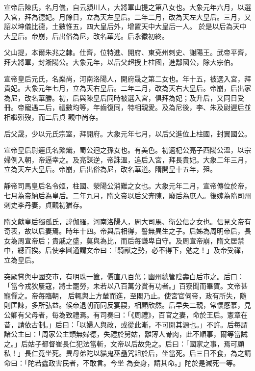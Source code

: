 \begin{pinyinscope}
 宣帝后陳氏，名月儀，自云潁川人，大將軍山提之第八女也。大象元年六月，以選入宮，拜為德妃。月餘日，立為天左皇后。二年二月，改為天左大皇后。三月，又詔以坤儀比德，土數惟五，四大皇后外，增置天中大皇后一人。
 於是以后為天中大皇后。帝崩，后出俗為尼，改名華光。后永徽初終。



 父山提，本爾朱兆之隸。仕齊，位特進、開府、東兗州刺史、謝陽王。武帝平齊，拜大將軍，封淅陽公。大象元年，以后父超授上柱國，進鄅國公，除大宗伯。



 宣帝皇后元氏，名樂尚，河南洛陽人，開府晟之第二女也。年十五，被選入宮，拜貴妃。大象元年七月，立為天右皇后。二年二月，改為天右大皇后。帝崩，后出家為尼，改名華勝。初，后與陳皇后同時被選入宮，俱拜為妃；及升后，又同日受冊。帝寵遇二后，禮數均等，年齒復同，特相親愛。及為尼後，李、朱及尉遲后並相繼殞歿，而二后貞
 觀中尚存。



 后父晟，少以元氏宗室，拜開府。大象元年七月，以后父進位上柱國，封翼國公。



 宣帝皇后尉遲氏名繁熾，蜀公迥之孫女也。有美色。初適杞公亮子西陽公溫，以宗婦例入朝，帝逼幸之。及亮謀逆，帝誅溫，追后入宮，拜長貴妃。大象二年三月，立為天左大皇后。帝崩，后出俗為尼，改名華道。隋開皇十五年，殂。



 靜帝司馬皇后名令姬，柱國、滎陽公消難之女也。大象元年二月，宣帝傳位於帝，七月為帝納后為皇后。二年九月，隋文帝以后父奔陳，廢后為庶人。後嫁為隋司州
 刺史李丹妻，貞觀初猶存。



 隋文獻皇后獨孤氏，諱伽羅，河南洛陽人，周大司馬、衛公信之女也。信見文帝有奇表，故以后妻焉。時年十四。帝與后相得，誓無異生之子。后姊為周明帝后，長女為周宣帝后；貴戚之盛，莫與為比，而后每謙卑自守。及周宣帝崩，隋文居禁中，總百揆。后使李圓通謂文帝曰：「騎獸之勢，必不得下，勉之！」及帝受禪，立為皇后。



 突厥嘗與中國交市，有明珠一篋，價直八百萬；幽州總管陰壽白后市之。后曰：「當今戎狄屢寇，將士罷勞，未若以八百萬分賞有功者。」百寮聞而畢賀。文帝甚寵憚之。帝每臨朝，
 后輒與上方輦而進，至閣乃止。使宮官伺帝，政有所失，隨則匡諫，多所弘益。候帝退朝而同反宴寢，相顧欣然。后早失二親，常懷感慕，見公卿有父母者，每為致禮焉。有司奏曰：「《周禮》，百官之妻，命於王后。憲章在昔，請依古制。」后曰：「以婦人與政，或從此漸，不可開其源也。」不許。后每謂諸公主曰：「周家公主類無婦德，失禮於舅姑，離薄人骨肉，此不順事，爾等當誡之。」后姑子都督崔長仁犯法當斬，文帝以后故免之。后曰：「國家之事，焉可顧私！」長仁竟坐死。異母弟陀以貓鬼巫蠱咒詛於后，坐當死。后三日不食，為之請命曰：「陀若蠹政害民者，不敢言。今坐
 為妾身，請其命。」陀於是減死一等。




\end{pinyinscope}

